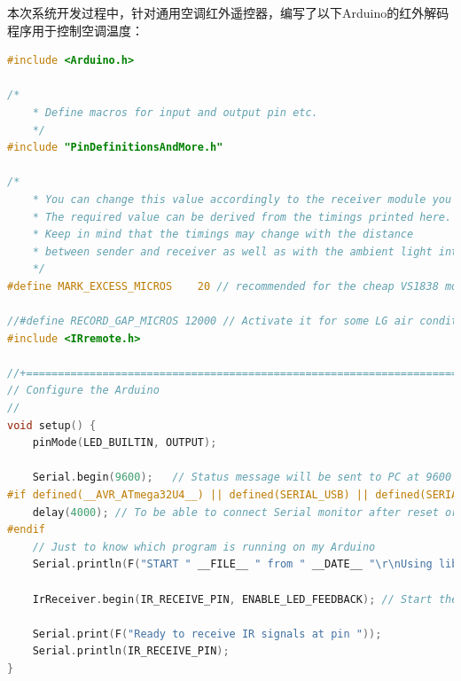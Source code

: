本次系统开发过程中，针对通用空调红外遥控器，编写了以下Arduino的红外解码程序用于控制空调温度：
\begin{lstlisting}[language=C,title=代码4-1: Arduino的红外解码程序]
#include <Arduino.h>

/*
	* Define macros for input and output pin etc.
	*/
#include "PinDefinitionsAndMore.h"

/*
	* You can change this value accordingly to the receiver module you use.
	* The required value can be derived from the timings printed here.
	* Keep in mind that the timings may change with the distance
	* between sender and receiver as well as with the ambient light intensity.
	*/
#define MARK_EXCESS_MICROS    20 // recommended for the cheap VS1838 modules

//#define RECORD_GAP_MICROS 12000 // Activate it for some LG air conditioner protocols
#include <IRremote.h>

//+=============================================================================
// Configure the Arduino
//
void setup() {
	pinMode(LED_BUILTIN, OUTPUT);

	Serial.begin(9600);   // Status message will be sent to PC at 9600 baud
#if defined(__AVR_ATmega32U4__) || defined(SERIAL_USB) || defined(SERIAL_PORT_USBVIRTUAL)  || defined(ARDUINO_attiny3217)
	delay(4000); // To be able to connect Serial monitor after reset or power up and before first print out. Do not wait for an attached Serial Monitor!
#endif
	// Just to know which program is running on my Arduino
	Serial.println(F("START " __FILE__ " from " __DATE__ "\r\nUsing library version " VERSION_IRREMOTE));

	IrReceiver.begin(IR_RECEIVE_PIN, ENABLE_LED_FEEDBACK); // Start the receiver, enable feedback LED, take LED feedback pin from the internal boards definition

	Serial.print(F("Ready to receive IR signals at pin "));
	Serial.println(IR_RECEIVE_PIN);
}


\end{lstlisting}
